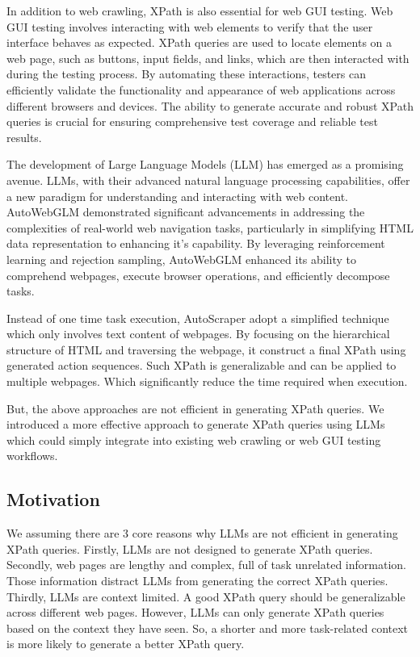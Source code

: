 \documentclass[a4paper]{article}
\begin{document}
In addition to web crawling, XPath is also essential for web GUI testing. Web GUI testing involves interacting with web elements to verify that the user interface behaves as expected. XPath queries are used to locate elements on a web page, such as buttons, input fields, and links, which are then interacted with during the testing process. By automating these interactions, testers can efficiently validate the functionality and appearance of web applications across different browsers and devices. The ability to generate accurate and robust XPath queries is crucial for ensuring comprehensive test coverage and reliable test results.

The development of Large Language Models (LLM) has emerged as a promising avenue. LLMs, with their advanced natural language processing capabilities, offer a new paradigm for understanding and interacting with web content. AutoWebGLM\cite{lai2024autowebglmlargelanguagemodelbased} demonstrated significant advancements in addressing the complexities of real-world web navigation tasks, particularly in simplifying HTML data representation to enhancing it's capability. By leveraging reinforcement learning and rejection sampling, AutoWebGLM enhanced its ability to comprehend webpages, execute browser operations, and efficiently decompose tasks.

Instead of one time task execution, AutoScraper\cite{huang2024autoscraperprogressiveunderstandingweb} adopt a simplified technique which only involves text content of webpages. By focusing on the hierarchical structure of HTML and traversing the webpage, it construct a final XPath using generated action sequences. Such XPath is generalizable and can be applied to multiple webpages. Which significantly reduce the time required when execution.

But, the above approaches are not efficient in generating XPath queries. We introduced a more effective approach to generate XPath queries using LLMs which could simply integrate into existing web crawling or web GUI testing workflows. 

\subsection{Motivation}

We assuming there are 3 core reasons why LLMs are not efficient in generating XPath queries. Firstly, LLMs are not designed to generate XPath queries. Secondly, web pages are lengthy and complex, full of task unrelated information. Those information distract LLMs from generating the correct XPath queries. Thirdly, LLMs are context limited. A good XPath query should be generalizable across different web pages. However, LLMs can only generate XPath queries based on the context they have seen. So, a shorter and more task-related context is more likely to generate a better XPath query.
\end{document}

